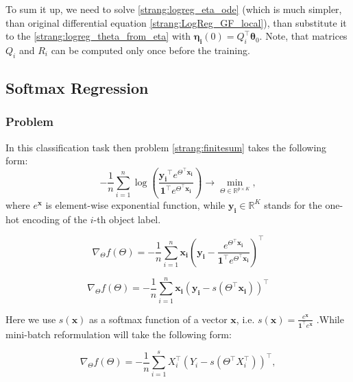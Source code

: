 \documentclass{article}
\newcommand{\vect}[1]{\boldsymbol{\mathbf{#1}}}
\begin{document}
To sum it up, we need to solve \eqref{strang:logreg_eta_ode} (which is much simpler, than original differential equation \eqref{strang:LogReg_GF_local}), than substitute it to the
\eqref{strang:logreg_theta_from_eta} with $\vect{\eta_i}(0) = Q_i^\top \vect{\theta}_0$. Note, that matrices $Q_i$ and $R_i$ can be computed only once before the training.

\subsection{Softmax Regression}
\subsubsection{Problem}
In this classification task then problem \eqref{strang:finitesum} takes the following form:
\begin{equation}\label{strang:Softmax}
-\frac{1}{n} \sum_{i=1}^n\log\left(\frac{\vect{y_i}^\top e^{\Theta^\top \vect{x_i}}}{\vect{1}^\top e^{\Theta^\top \vect{x_i}}}\right) \to \min_{\Theta \in \mathbb{R}^{p \times K}},
\end{equation}
where $e^{\vect{x}}$ is element-wise exponential function, while $ \vect{y_i} \in \mathbb{R}^K$ stands for the one-hot encoding of the $i$-th object label.

\begin{equation}
\nabla_\Theta f(\Theta) = -\frac{1}{n} \sum_{i=1}^n\vect{x_i}\left(\vect{y_i} - \frac{ e^{\Theta^\top \vect{x_i}}}{\vect{1}^\top e^{\Theta^\top \vect{x_i}}}\right)^\top
\end{equation}

\begin{equation}
\nabla_\Theta f(\Theta) = -\frac{1}{n} \sum_{i=1}^n\vect{x_i}\left(\vect{y_i} - s\left(\Theta^\top \vect{x_i}\right)\right)^\top
\end{equation}


Here we use $s(\vect{x})$ as a softmax function of a vector $\vect{x}$, i.e. $s(\vect{x}) = \frac{e^{\vect{x}}}{\vect{1}^\top e^{\vect{x}}}$ .While mini-batch reformulation will take the following form:

\begin{equation}
\nabla_\Theta f(\Theta) = -\frac{1}{n} \sum_{i=1}^s X_i^\top\left(Y_i - s(\Theta^\top X_i^\top)\right)^\top,
\end{equation}
\end{document}
